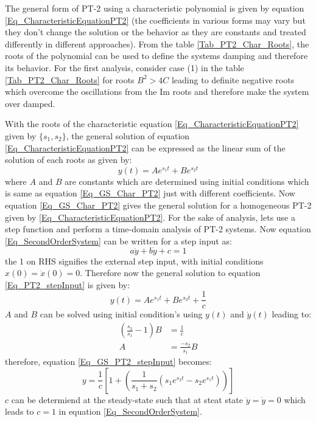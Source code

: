 The general form of PT-2 using a characteristic polynomial is given by equation \eqref{Eq_CharacteristicEquationPT2} (the coefficients in various forms may vary but they don't change the solution or the behavior as they are constants and treated differently in different approaches). From the table \ref{Tab_PT2_Char_Roots}, the roots of the polynomial can be used to define the systems damping and therefore its behavior. For the first analysis, consider case (1) in the table \ref{Tab_PT2_Char_Roots} for roots $B^{2} > 4C$ leading to definite negative roots which overcome the oscillations from the Im roots and therefore make the system over damped.

With the roots of the characteristic equation \eqref{Eq_CharacteristicEquationPT2} given by $\{s_1, s_2\}$, the general solution of equation \eqref{Eq_CharacteristicEquationPT2} can be expressed as the linear sum of the solution of each roots as given by:
\begin{equation}
	y(t) = A e^{s_{1}t} + B e^{s_{2}t}
\end{equation}
where $A$ and $B$ are constants which are determined using initial conditions which is same as equation \eqref{Eq_GS_Char_PT2} just with different coefficients. Now equation \eqref{Eq_GS_Char_PT2} gives the general solution for a homogeneous PT-2 given by \eqref{Eq_CharacteristicEquationPT2}. For the sake of analysis, lets use a step function and perform a time-domain analysis of PT-2 systems. Now equation \eqref{Eq_SecondOrderSystem} can be written for a step input as:
\begin{equation} \label{Eq_PT2_stepInput}
	a \ddot{y} + b \dot{y} + c = 1
\end{equation}
the 1 on RHS signifies the external step input, with initial conditions $x(0) = \dot{x}(0) = 0$. Therefore now the general solution to equation \eqref{Eq_PT2_stepInput} is given by:
\begin{equation} \label{Eq_GS_PT2_stepInput}
	y(t) = A e^{s_{1}t} + B e^{s_{2}t} + \frac{1}{c}
\end{equation}
$A$ and $B$ can be solved using initial condition's using $y(t)$ and $\dot{y}(t)$ leading to:
\begin{align*}
	\left(\frac{s_2}{s_1} - 1 \right) B &= \frac{1}{c} \\
	A &= \frac{-s_2}{s_1} B
\end{align*}
therefore, equation \eqref{Eq_GS_PT2_stepInput} becomes:
\begin{equation}
	y = \frac{1}{c} \left[ 1 + \left( \frac{1}{s_1 + s_2} (s_1 e^{s_{2}t} - s_2 e^{s_{1}t}) \right) \right]
\end{equation}
$c$ can be determiend at the steady-state such that at steat state $\ddot{y} = \dot{y} = 0$ which leads to $c = 1$ in equation \eqref{Eq_SecondOrderSystem}.

